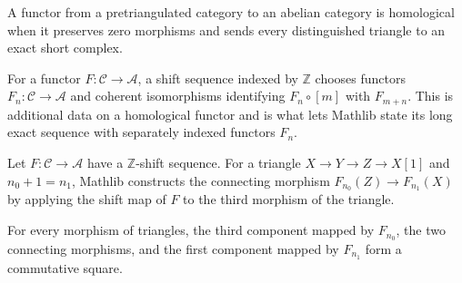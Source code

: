 \begin{definition}
  \label{def:mathlib-homological-functor}
  \mathlibok
  A functor from a pretriangulated category to an abelian category is
  homological when it preserves zero morphisms and sends every distinguished
  triangle to an exact short complex.
\end{definition}

\begin{definition}
  \label{def:mathlib-homological-shift-sequence}
  \mathlibok
  For a functor $F:\mathcal C\to\mathcal A$, a shift sequence indexed by
  $\mathbb Z$ chooses functors $F_n:\mathcal C\to\mathcal A$ and coherent
  isomorphisms identifying $F_n\circ[m]$ with $F_{m+n}$.  This is additional
  data on a homological functor and is what lets Mathlib state its long exact
  sequence with separately indexed functors $F_n$.
\end{definition}

\begin{definition}
  \label{def:mathlib-homology-sequence-connecting}
  \mathlibok
  Let $F:\mathcal C\to\mathcal A$ have a $\mathbb Z$-shift sequence.  For a
  triangle $X\to Y\to Z\to X[1]$ and $n_0+1=n_1$, Mathlib constructs the
  connecting morphism $F_{n_0}(Z)\to F_{n_1}(X)$ by applying the shift map of
  $F$ to the third morphism of the triangle.
\end{definition}

\begin{theorem}
  \label{thm:mathlib-homology-sequence-connecting-naturality}
  \mathlibok
  For every morphism of triangles, the third component mapped by $F_{n_0}$,
  the two connecting morphisms, and the first component mapped by $F_{n_1}$
  form a commutative square.
\end{theorem}


